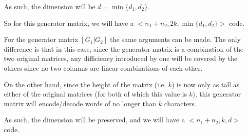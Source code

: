\documentclass{article}
\begin{document}
As such, the dimension will be $d=\min\{d_1,d_2\}$.

So for this generator matrix, we will have a $<n_1+n_2,2k,\min\{d_1,d_2\}>$ code.

For the generator matrix $[G_1|G_2]$ the same arguments can be made. The only
difference is that in this case, since the generator matrix is a combination of
the two original matrices, any difficiency introduced by one will be covered by
the others since no two columns are linear combinations of each other.

On the other hand, since the height of the matrix (i.e. $k$) is now only as tall
as either of the original matrices (for both of which this value is $k$), this
generator matrix will encode/decode words of no longer than $k$ characters.

As such, the dimension will be preserved, and we will have a $<n_1+n_2,k,d>$ code.
\end{document}
